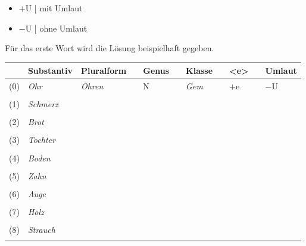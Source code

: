 \documentclass[12pt,a4paper,twoside]{article}
\newcommand{\gruen}[1]{\textcolor{gruen}{#1}}
\newcommand{\Lf}{
  \setlength{\itemsep}{1pt}
  \setlength{\parskip}{0pt}
  \setlength{\parsep}{0pt}
}
\begin{document}
\begin{itemize}\Lf
  \item $+$U | mit Umlaut
  \item $-$U | ohne Umlaut
\end{itemize}

Für das erste Wort wird die Lösung beispielhaft gegeben.

\newpage

\begin{center}
  \begin{longtable}[h]{rlp{}cp{}cp{}cp{}cp{}}
    \toprule
    & \textbf{Substantiv} & \textbf{Pluralform} && \textbf{Genus} && \textbf{Klasse} && \textbf{<e>} && \textbf{Umlaut} \\
    \midrule{}
    \endhead
    (0) & \textit{Ohr} & \gruen{\textit{Ohren}} && \gruen{N} && \gruen{\textit{Gem}} && \gruen{$+$e} && \gruen{$-$U} \\
    &&&&&&&& \\
    (1) & \textit{Schmerz} &&&&&&&&& \\\cline{3-3}\cline{5-5}\cline{7-7}\cline{9-9}\cline{11-11}
    &&&&&&&& \\
    (2) & \textit{Brot} &&&&&&&&& \\\cline{3-3}\cline{5-5}\cline{7-7}\cline{9-9}\cline{11-11}
    &&&&&&&& \\
    (3) & \textit{Tochter} &&&&&&&&& \\\cline{3-3}\cline{5-5}\cline{7-7}\cline{9-9}\cline{11-11}
    &&&&&&&& \\
    (4) & \textit{Boden} &&&&&&&&& \\\cline{3-3}\cline{5-5}\cline{7-7}\cline{9-9}\cline{11-11}
    &&&&&&&& \\
    (5) & \textit{Zahn} &&&&&&&&& \\\cline{3-3}\cline{5-5}\cline{7-7}\cline{9-9}\cline{11-11}
    &&&&&&&& \\
    (6) & \textit{Auge} &&&&&&&&& \\\cline{3-3}\cline{5-5}\cline{7-7}\cline{9-9}\cline{11-11}
    &&&&&&&& \\
    (7) & \textit{Holz} &&&&&&&&& \\\cline{3-3}\cline{5-5}\cline{7-7}\cline{9-9}\cline{11-11}
    &&&&&&&& \\
    (8) & \textit{Strauch} &&&&&&&&& \\\cline{3-3}\cline{5-5}\cline{7-7}\cline{9-9}\cline{11-11}
    &&&&&&&& \\

\end{longtable}
\end{center}
\end{document}
